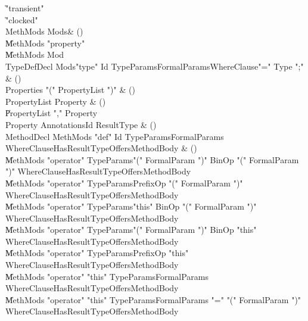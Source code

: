 \begin{bbgrammar}

    \| \xcd"transient"\\
    \| \xcd"clocked"\\
 MethMods  \label{prod:MethMods}  \: Mods\opt & ()\\
    \| MethMods \xcd"property" \\
    \| MethMods Mod\\
 TypeDefDecl  \label{prod:TypeDefDecl}  \: Mods\opt \xcd"type" Id TypeParams\opt FormalParams\opt WhereClause\opt \xcd"=" Type \xcd";" & ()\\
 Properties  \label{prod:Properties}  \: \xcd"(" PropertyList \xcd")" & ()\\
 PropertyList  \label{prod:PropertyList}  \: Property & ()\\
    \| PropertyList \xcd"," Property\\
 Property  \label{prod:Property}  \: Annotations\opt Id ResultType & ()\\
 MethodDecl  \label{prod:MethodDecl}  \: MethMods \xcd"def" Id TypeParams\opt FormalParams WhereClause\opt HasResultType\opt Offers\opt MethodBody & ()\\
    \| MethMods \xcd"operator" TypeParams\opt \xcd"(" FormalParam  \xcd")" BinOp \xcd"(" FormalParam  \xcd")" WhereClause\opt HasResultType\opt Offers\opt MethodBody\\
    \| MethMods \xcd"operator" TypeParams\opt PrefixOp \xcd"(" FormalParam  \xcd")" WhereClause\opt HasResultType\opt Offers\opt MethodBody\\
    \| MethMods \xcd"operator" TypeParams\opt \xcd"this" BinOp \xcd"(" FormalParam  \xcd")" WhereClause\opt HasResultType\opt Offers\opt MethodBody\\
    \| MethMods \xcd"operator" TypeParams\opt \xcd"(" FormalParam  \xcd")" BinOp \xcd"this" WhereClause\opt HasResultType\opt Offers\opt MethodBody\\
    \| MethMods \xcd"operator" TypeParams\opt PrefixOp \xcd"this" WhereClause\opt HasResultType\opt Offers\opt MethodBody\\
    \| MethMods \xcd"operator" \xcd"this" TypeParams\opt FormalParams WhereClause\opt HasResultType\opt Offers\opt MethodBody\\
    \| MethMods \xcd"operator" \xcd"this" TypeParams\opt FormalParams \xcd"=" \xcd"(" FormalParam  \xcd")" WhereClause\opt HasResultType\opt Offers\opt MethodBody\\

\end{bbgrammar}
